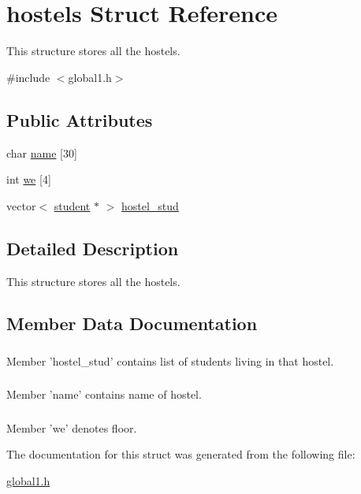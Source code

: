 \hypertarget{structhostels}{\section{hostels \-Struct \-Reference}
\label{structhostels}
}


\-This structure stores all the hostels.  




{\ttfamily \#include $<$global1.\-h$>$}

\subsection*{\-Public \-Attributes}
\begin{DoxyCompactItemize}
\item 
char \hyperlink{structhostels_a622bd4aee612f3e7c5fe8f063138110a}{name} \mbox{[}30\mbox{]}
\item 
int \hyperlink{structhostels_ae3ed8415656851af205da5d453794b2a}{we} \mbox{[}4\mbox{]}
\item 
vector$<$ \hyperlink{structstudent}{student} $\ast$ $>$ \hyperlink{structhostels_ab9adb823cfa6fe9f7696e375a753756e}{hostel\-\_\-stud}
\end{DoxyCompactItemize}


\subsection{\-Detailed \-Description}
\-This structure stores all the hostels. 

\subsection{\-Member \-Data \-Documentation}
\hypertarget{structhostels_ab9adb823cfa6fe9f7696e375a753756e}{
\subsubsection[{hostel\-\_\-stud}]{}}\label{structhostels_ab9adb823cfa6fe9f7696e375a753756e}
\-Member 'hostel\-\_\-stud' contains list of students living in that hostel. \hypertarget{structhostels_a622bd4aee612f3e7c5fe8f063138110a}{
\subsubsection[{name}]{}}\label{structhostels_a622bd4aee612f3e7c5fe8f063138110a}
\-Member 'name' contains name of hostel. \hypertarget{structhostels_ae3ed8415656851af205da5d453794b2a}{
\subsubsection[{we}]{}}\label{structhostels_ae3ed8415656851af205da5d453794b2a}
\-Member 'we' denotes floor. 

\-The documentation for this struct was generated from the following file\-:\begin{DoxyCompactItemize}
\item 
\hyperlink{global1_8h}{global1.\-h}\end{DoxyCompactItemize}
